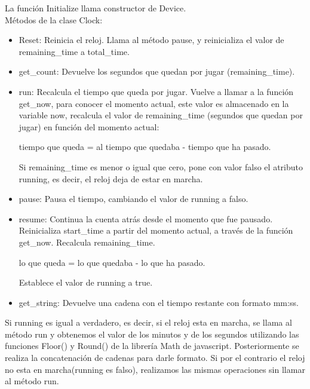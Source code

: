 La función Initialize llama constructor de Device.\\

Métodos de la clase Clock:

\begin{itemize}
 \item Reset: Reinicia el reloj. Llama al método pause, y reinicializa el valor de remaining\_time a total\_time.

 \item get\_count: Devuelve los segundos que quedan por jugar (remaining\_time).

 \item run: Recalcula el tiempo que queda por jugar. Vuelve a llamar a la función get\_now, para conocer el momento actual, este valor es almacenado 
en la variable now, recalcula el valor de remaining\_time (segundos que quedan por jugar) en función del momento actual:

        tiempo que queda = al tiempo que quedaba - tiempo que ha pasado.
        
Si remaining\_time es menor o igual que cero, pone con valor falso el atributo running, es decir, el reloj deja de estar en marcha.

 \item pause: Pausa el tiempo, cambiando el valor de running a falso.

 \item resume: Continua la cuenta atrás desde el momento que fue pausado. Reinicializa start\_time a partir del momento actual, a través de la 
 función get\_now. Recalcula remaining\_time.

        lo que queda = lo que quedaba - lo que ha pasado.

Establece el valor de running a true.

 \item get\_string: Devuelve una cadena con el tiempo restante con formato mm:ss.
\end{itemize}

Si running es igual a verdadero, es decir, si el reloj esta en marcha, se llama al método run y obtenemos el valor de los minutos y de los 
segundos utilizando las funciones Floor() y Round() de la librería Math de javascript. Posteriormente se realiza la concatenación de cadenas para 
darle formato. Si por el contrario el reloj no esta en marcha(running es falso), realizamos las mismas operaciones sin llamar al método run.

